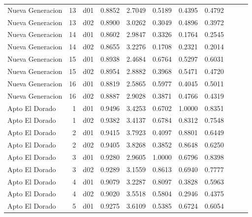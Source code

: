 \begin{landscape}
\begin{longtable}{p{2cm}rrrrrrrrrr}
        Nueva Generacion  &         13 &     d01 &   0.8852 &  2.7049 &        0.5189 &           0.4395 &  0.4792 \\
        Nueva Generacion  &         13 &     d02 &   0.8900 &  3.0262 &        0.3049 &           0.4896 &  0.3972 \\
        Nueva Generacion  &         14 &     d01 &   0.8602 &  2.9847 &        0.3326 &           0.1764 &  0.2545 \\
        Nueva Generacion  &         14 &     d02 &   0.8655 &  3.2276 &        0.1708 &           0.2321 &  0.2014 \\
        Nueva Generacion  &         15 &     d01 &   0.8938 &  2.4684 &        0.6764 &           0.5297 &  0.6031 \\
        Nueva Generacion  &         15 &     d02 &   0.8954 &  2.8882 &        0.3968 &           0.5471 &  0.4720 \\
        Nueva Generacion  &         16 &     d01 &   0.8819 &  2.5865 &        0.5977 &           0.4045 &  0.5011 \\
        Nueva Generacion  &         16 &     d02 &   0.8887 &  2.9028 &        0.3871 &           0.4766 &  0.4319 \\
          Apto El Dorado  &          1 &     d01 &   0.9496 &  3.4253 &        0.6702 &           1.0000 &  0.8351 \\
          Apto El Dorado  &          1 &     d02 &   0.9382 &  3.4137 &        0.6784 &           0.8312 &  0.7548 \\
          Apto El Dorado  &          2 &     d01 &   0.9415 &  3.7923 &        0.4097 &           0.8801 &  0.6449 \\
          Apto El Dorado  &          2 &     d02 &   0.9405 &  3.8268 &        0.3852 &           0.8648 &  0.6250 \\
          Apto El Dorado  &          3 &     d01 &   0.9280 &  2.9605 &        1.0000 &           0.6796 &  0.8398 \\
          Apto El Dorado  &          3 &     d02 &   0.9289 &  3.1559 &        0.8613 &           0.6940 &  0.7777 \\
          Apto El Dorado  &          4 &     d01 &   0.9079 &  3.2287 &        0.8097 &           0.3828 &  0.5963 \\
          Apto El Dorado  &          4 &     d02 &   0.9020 &  3.5518 &        0.5804 &           0.2946 &  0.4375 \\
          Apto El Dorado  &          5 &     d01 &   0.9275 &  3.6109 &        0.5385 &           0.6724 &  0.6054 \\

\end{longtable}
\end{landscape}
